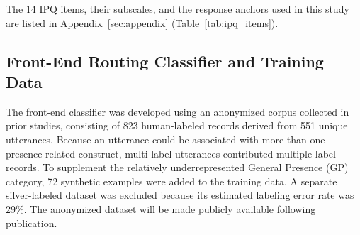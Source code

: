 The 14 IPQ items, their subscales, and the response anchors used in this study are listed in Appendix~\ref{sec:appendix} (Table~\ref{tab:ipq_items}).



\subsection{Front-End Routing Classifier and Training Data} 





The front-end classifier was developed using an anonymized corpus collected in prior studies, consisting of 823 human-labeled records derived from 551 unique utterances. Because an utterance could be associated with more than one presence-related construct, multi-label utterances contributed multiple label records. To supplement the relatively underrepresented General Presence (GP) category, 72 synthetic examples were added to the training data. A separate silver-labeled dataset was excluded because its estimated labeling error rate was 29\%. The anonymized dataset will be made publicly available following publication.

